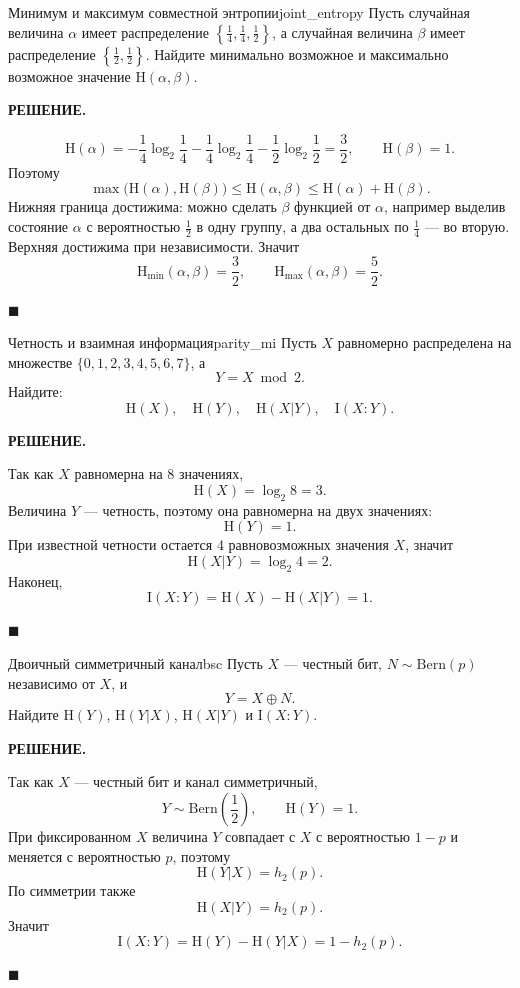 \documentclass[12pt,a4paper]{article}
\renewcommand{\le}{\leqslant}
\newcommand{\HH}{\mathrm{H}}
\newcommand{\II}{\mathrm{I}}
\newenvironment{solution}{
    \begin{tcolorbox}[
        enhanced, breakable, blanker,
        borderline west={2.5pt}{0pt}{solgray},
        left=12pt, top=5pt, bottom=5pt,
        before skip=10pt, after skip=15pt
    ]
    \textbf{\textsf{РЕШЕНИЕ.}}\;
}{
    \hfill $\blacksquare$
    \end{tcolorbox}
}
\begin{document}
\begin{problem}{Минимум и максимум совместной энтропии}{joint_entropy}
Пусть случайная величина $\alpha$ имеет распределение $\left\{\frac14,\frac14,\frac12\right\}$, а случайная величина $\beta$ имеет распределение $\left\{\frac12,\frac12\right\}$. Найдите минимально возможное и максимально возможное значение $\HH(\alpha,\beta)$.
\end{problem}
\begin{solution}
$$
\HH(\alpha)= -\frac14\log_2\frac14-\frac14\log_2\frac14-\frac12\log_2\frac12=\frac32,
\qquad
\HH(\beta)=1.
$$
Поэтому
$$
\max\bigl(\HH(\alpha),\HH(\beta)\bigr)\le \HH(\alpha,\beta)\le \HH(\alpha)+\HH(\beta).
$$
Нижняя граница достижима: можно сделать $\beta$ функцией от $\alpha$, например выделив состояние $\alpha$ с вероятностью $\frac12$ в одну группу, а два остальных по $\frac14$ --- во вторую. Верхняя достижима при независимости. Значит
$$
\HH_{\min}(\alpha,\beta)=\frac32,
\qquad
\HH_{\max}(\alpha,\beta)=\frac52.
$$
\end{solution}

\begin{problem}{Четность и взаимная информация}{parity_mi}
Пусть $X$ равномерно распределена на множестве $\{0,1,2,3,4,5,6,7\}$, а
$$
Y=X \bmod 2.
$$
Найдите:
$$
\HH(X),\quad \HH(Y),\quad \HH(X|Y),\quad \II(X:Y).
$$
\end{problem}
\begin{solution}
Так как $X$ равномерна на $8$ значениях,
$$
\HH(X)=\log_2 8=3.
$$
Величина $Y$ --- четность, поэтому она равномерна на двух значениях:
$$
\HH(Y)=1.
$$
При известной четности остается $4$ равновозможных значения $X$, значит
$$
\HH(X|Y)=\log_2 4=2.
$$
Наконец,
$$
\II(X:Y)=\HH(X)-\HH(X|Y)=1.
$$
\end{solution}

\begin{problem}{Двоичный симметричный канал}{bsc}
Пусть $X$ --- честный бит, $N\sim \mathrm{Bern}(p)$ независимо от $X$, и
$$
Y=X\oplus N.
$$
Найдите $\HH(Y)$, $\HH(Y|X)$, $\HH(X|Y)$ и $\II(X:Y)$.
\end{problem}
\begin{solution}
Так как $X$ --- честный бит и канал симметричный,
$$
Y \sim \mathrm{Bern}\left(\frac12\right),
\qquad
\HH(Y)=1.
$$
При фиксированном $X$ величина $Y$ совпадает с $X$ с вероятностью $1-p$ и меняется с вероятностью $p$, поэтому
$$
\HH(Y|X)=h_2(p).
$$
По симметрии также
$$
\HH(X|Y)=h_2(p).
$$
Значит
$$
\II(X:Y)=\HH(Y)-\HH(Y|X)=1-h_2(p).
$$
\end{solution}
\end{document}
